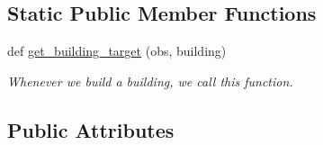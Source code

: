 \subsection*{Static Public Member Functions}
\begin{DoxyCompactItemize}
\item 
def \hyperlink{classBotty__McBotface_1_1Botty_a729cd86d54aa83a7f01a458d03fde940}{get\+\_\+building\+\_\+target} (obs, building)
\begin{DoxyCompactList}\small\item\em Whenever we build a building, we call this function. \end{DoxyCompactList}\end{DoxyCompactItemize}
\subsection*{Public Attributes}

